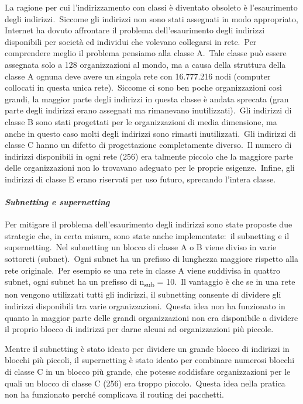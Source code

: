 La ragione per cui l'indirizzamento con classi è diventato obsoleto è l'esaurimento degli indirizzi.\
Siccome gli indirizzi non sono stati assegnati in modo appropriato, Internet ha dovuto affrontare il problema dell'esaurimento degli indirizzi disponibili per società ed individui che volevano collegarsi in rete.\
Per comprendere meglio il problema pensiamo alla classe A.\
Tale classe può essere assegnata solo a 128 organizzazioni al mondo, ma a causa della struttura della classe A ognuna deve avere un singola rete con 16.777.216 nodi (computer collocati in questa unica rete).\
Siccome ci sono ben poche organizzazioni così grandi, la maggior parte degli indirizzi in questa classe è andata sprecata (gran parte degli indirizzi erano assegnati ma rimanevano inutilizzati).\
Gli indirizzi di classe B sono stati progettati per le organizzazioni di media dimensione, ma anche in questo caso molti degli indirizzi sono rimasti inutilizzati.\
Gli indirizzi di classe C hanno un difetto di progettazione completamente diverso.\
Il numero di indirizzi disponibili in ogni rete (256) era talmente piccolo che la maggiore parte delle organizzazioni non lo trovavano adeguato per le proprie esigenze.\
Infine, gli indirizzi di classe E erano riservati per uso futuro, sprecando l'intera classe.

\paragraph{\emph{Subnetting e supernetting}}

Per mitigare il problema dell'esaurimento degli indirizzi sono state proposte due strategie che, in certa misura, sono state anche implementate:\ il subnetting e il supernetting.\
Nel subnetting un blocco di classe A o B viene diviso in varie sottoreti (subnet).\
Ogni subnet ha un prefisso di lunghezza maggiore rispetto alla rete originale.\
Per esempio se una rete in classe A viene suddivisa in quattro subnet, ogni subnet ha un prefisso di n\textsubscript{sub} = 10.\
Il vantaggio è che se in una rete non vengono utilizzati tutti gli indirizzi, il subnetting consente di dividere gli indirizzi disponibili tra varie organizzazioni.\
Questa idea non ha funzionato in quanto la maggior parte delle grandi organizzazioni non era disponibile a dividere il proprio blocco di indirizzi per darne alcuni ad organizzazioni più piccole.

Mentre il subnetting è stato ideato per dividere un grande blocco di indirizzi in blocchi più piccoli, il supernetting è stato ideato per combinare numerosi blocchi di classe C in un blocco più grande, che potesse soddisfare organizzazioni per le quali un blocco di classe C (256) era troppo piccolo.\
Questa idea nella pratica non ha funzionato perché complicava il routing dei pacchetti.

